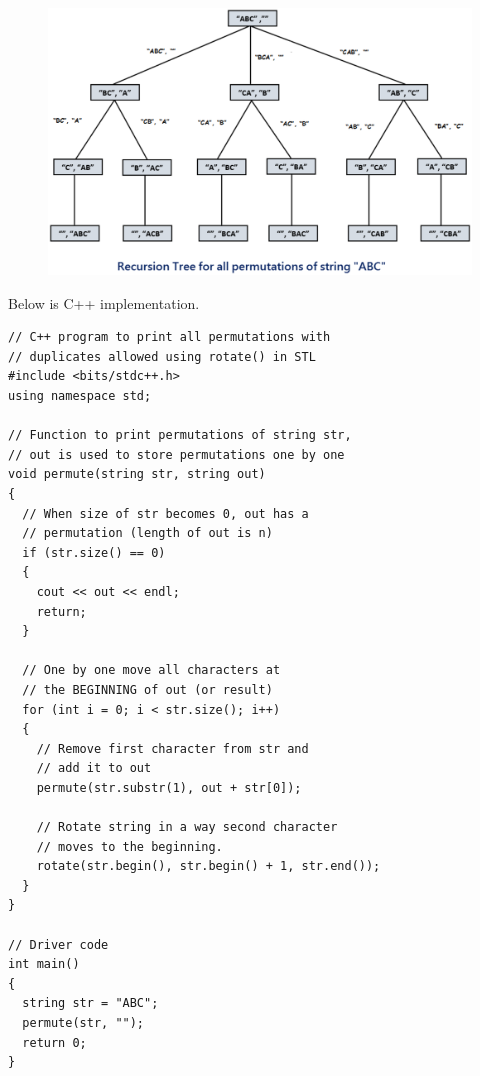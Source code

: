 \begin{figure}
\centering
\includegraphics[width=1\textwidth]{Images/figGFGPermuteRotateRecur}
\label{figGFGPermuteRotateRecur}
\end{figure}

Below is C++ implementation.
\begin{lstlisting}[style=raycppnewsnippet]
// C++ program to print all permutations with
// duplicates allowed using rotate() in STL
#include <bits/stdc++.h>
using namespace std;
 
// Function to print permutations of string str,
// out is used to store permutations one by one
void permute(string str, string out)
{
  // When size of str becomes 0, out has a
  // permutation (length of out is n)
  if (str.size() == 0)
  {
    cout << out << endl;
    return;
  }
 
  // One by one move all characters at
  // the BEGINNING of out (or result)
  for (int i = 0; i < str.size(); i++)
  {
    // Remove first character from str and
    // add it to out
    permute(str.substr(1), out + str[0]);
 
    // Rotate string in a way second character
    // moves to the beginning.
    rotate(str.begin(), str.begin() + 1, str.end());
  }
}
 
// Driver code
int main()
{
  string str = "ABC";
  permute(str, "");
  return 0;
}
\end{lstlisting}


